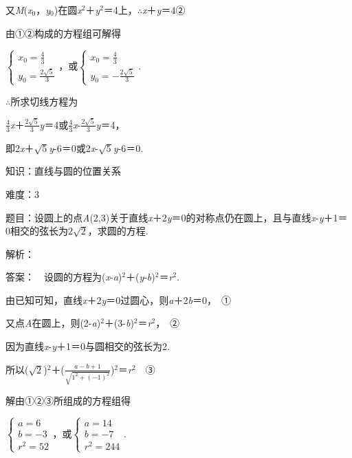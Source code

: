 \documentclass{article} %
\begin{document}
又\textit{M}(\textit{x}${}_{0}$，\textit{y}${}_{0}$)在圆\textit{x}${}^{2}$＋\textit{y}${}^{2}$＝4上，$\mathrm{\therefore}$\textit{x}＋\textit{y}＝4②

由①②构成的方程组可解得

$\left\{\begin{array}{r} x_0=\frac{4}{3}\\ y_0=\frac{2\sqrt{5}}{3} \end{array} \right.$，或$\left\{\begin{array}{r} x_0=\frac{4}{3}\\ y_0=-\frac{2\sqrt{5}}{3} \end{array} \right.$.

$\mathrm{\therefore}$所求切线方程为

$\frac{4}{3}$\textit{x}＋$\frac{2\sqrt{5}}{3}$\textit{y}＝4或$\frac{4}{3}$\textit{x}-$\frac{2\sqrt{5}}{3}$\textit{y}＝4，

即2\textit{x}＋$\sqrt{5}$\textit{y}-6＝0或2\textit{x}-$\sqrt{5}$\textit{y}-6＝0.

知识：直线与圆的位置关系

难度：3

题目：设圆上的点\textit{A}(2,3)关于直线\textit{x}＋2\textit{y}＝0的对称点仍在圆上，且与直线\textit{x}-\textit{y}＋1＝0相交的弦长为$2\sqrt{2}$，求圆的方程.

解析：

答案：　设圆的方程为(\textit{x}-\textit{a})${}^{2}$＋(\textit{y}-\textit{b})${}^{2}$＝\textit{r}${}^{2}$.

由已知可知，直线\textit{x}＋2\textit{y}＝0过圆心，则\textit{a}＋2\textit{b}＝0，　①

又点\textit{A}在圆上，则(2-\textit{a})${}^{2}$＋(3-\textit{b})${}^{2}$＝\textit{r}${}^{2}$，　②

因为直线\textit{x}-\textit{y}＋1＝0与圆相交的弦长为2.

所以($\sqrt{2}$)${}^{2}$＋($\frac{a-b+1}{\sqrt{1^2+(-1)^2}}$)${}^{2}$＝\textit{r}${}^{2}$　③

解由①②③所组成的方程组得

$\left\{\begin{array}{r} a=6\\ b=-3\\ r^2=52 \end{array} \right.$，或$\left\{\begin{array}{r} a=14\\ b=-7\\ r^2=244 \end{array} \right.$.
\end{document}
